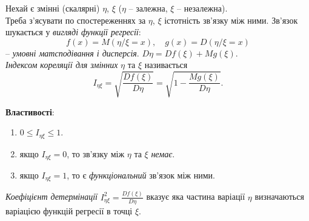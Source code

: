 Нехай є змінні (скалярні) $\eta$, $\xi$ ($\eta$ -- залежна, $\xi$ -- незалежна). \\

Треба з'ясувати по спостереженнях за $\eta$, $\xi$ істотність зв'язку між ними. Зв'язок шукається у \textit{вигляді функції регресії}: \[ f(x) = M(\eta / \xi = x), \quad g(x) = D(\eta / \xi = x) \] -- \textit{умовні матсподівання і дисперсія}. $D\eta = Df(\xi)+ Mg(\xi)$. \\

\textit{Індексом кореляції для змінних} $\eta$ та $\xi$ називається \[I_{\eta\xi} = \sqrt{\dfrac{Df(\xi)}{D\eta}} = \sqrt{1 - \dfrac{Mg(\xi)}{D\eta}}. \]

\textbf{Властивості}:
\begin{enumerate}
	\item $0 \le I_{\eta\xi} \le 1$.
	\item якщо $I_{\eta\xi} = 0$, то зв'язку між $\eta$ та $\xi$ \textit{немає}.
	\item якщо $I_{\eta\xi} = 1$, то є \textit{функціональний} зв'язок між ними.
\end{enumerate}

\textit{Коефіцієнт детермінації} $I_{\eta\xi}^2 = \frac{Df(\xi)}{D\eta}$ вказує яка частина варіації $\eta$ визначаються варіацією функцій регресії в точці $\xi$.